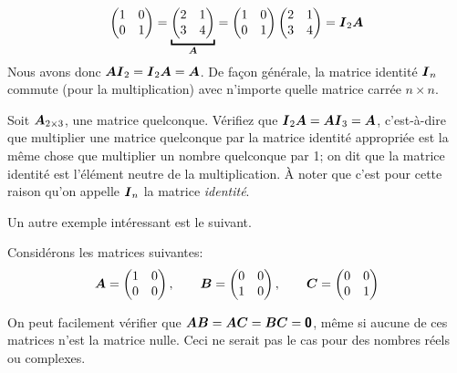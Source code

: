 \begin{exemple}
\[		\begin{pmatrix}
		1 & 0 \\
		0 & 1
		\end{pmatrix}
		=
		    \underbracket{\begin{pmatrix}
		    2 & 1 \\
		    3 & 4
		    \end{pmatrix}}_{\matA}
		    =
		\begin{pmatrix}
		1 & 0 \\
		0 & 1
		\end{pmatrix}
		    \begin{pmatrix}
		    2 & 1 \\
		    3 & 4
		    \end{pmatrix} = \matI_2 \matA
        \]
    Nous avons donc $\boldsymbol{A}\boldsymbol{I}_2 = \boldsymbol{I}_2 \boldsymbol{A} = \boldsymbol{A}$.  De façon générale, la matrice identité $\boldsymbol{I}_n$ commute 
    (pour la multiplication) avec n'importe quelle matrice carrée $n\times n$.
\end{exemple}

\begin{exerciceB}
Soit $\boldsymbol{A}_{2\times3}$, une matrice quelconque.  Vérifiez que $\boldsymbol{I}_2 \boldsymbol{A} = \boldsymbol{A} \boldsymbol{I}_3 = \boldsymbol{A}$, 
c'est-à-dire que multiplier une matrice quelconque par la matrice identité appropriée
est la même chose que multiplier un nombre quelconque par 1; on dit que la matrice
identité est l'élément neutre de la multiplication.  À noter que c'est
pour cette raison qu'on appelle $\boldsymbol{I}_n$ la matrice \textit{identité}.
\end{exerciceB}


Un autre exemple intéressant est le suivant.

\begin{exemple}
    Considérons les matrices suivantes:
    \[
    \boldsymbol{A} = \begin{pmatrix}
    1 & 0 \\
    0 & 0
    \end{pmatrix},
    \qquad
    \boldsymbol{B} = \begin{pmatrix}
    0 & 0 \\
    1 & 0
    \end{pmatrix},
    \qquad
    \boldsymbol{C} = \begin{pmatrix}
    0 & 0 \\
    0 & 1
    \end{pmatrix}
    \]
    
    On peut facilement vérifier que $\boldsymbol{A}\boldsymbol{B} = \boldsymbol{A}\boldsymbol{C} = \boldsymbol{B}\boldsymbol{C} = \mbox{\textsf{\textbf{{0}}}}$, même si aucune de ces matrices
    n'est la matrice nulle.  Ceci ne serait pas le cas pour des nombres réels ou complexes.
\end{exemple}

